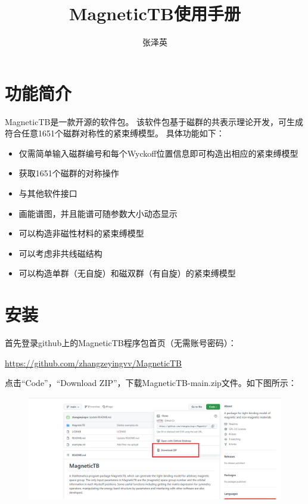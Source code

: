\documentclass[titlepage,a4paper,12pt,AutoFakeBold]{article}
\begin{document}
\title{\textsf{MagneticTB}使用手册}
\author{张泽英}

\maketitle


\tableofcontents

\newpage

\section{功能简介}
\textsf{MagneticTB}是一款开源的软件包。
该软件包基于磁群的共表示理论开发，可生成符合任意1651个磁群对称性的紧束缚模型。
具体功能如下：
\begin{itemize}
\item   仅需简单输入磁群编号和每个Wyckoff位置信息即可构造出相应的紧束缚模型
\item	获取1651个磁群的对称操作
\item	与其他软件接口
\item	画能谱图，并且能谱可随参数大小动态显示
\item	可以构造非磁性材料的紧束缚模型
\item	可以考虑非共线磁结构
\item	可以构造单群（无自旋）和磁双群（有自旋）的紧束缚模型
\end{itemize}


\section{安装}

  首先登录github上的\textsf{MagneticTB}程序包首页（无需账号密码）：
\begin{center}
\url{https://github.com/zhangzeyingvv/MagneticTB}
\end{center}
点击“Code”，“Download ZIP”，下载MagneticTB-main.zip文件。如下图所示：
\begin{figure}[h]
\includegraphics[width=1\textwidth]{./figures/安装1}
\end{figure}
\end{document}
